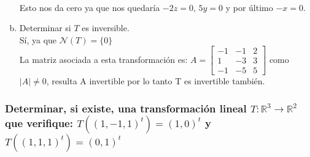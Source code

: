 \documentclass{article}
\begin{document}
\begin{enumerate}[a.]
		\\ Esto nos da cero ya que nos quedaría $-2z = 0$,  $5y=0$ y por último $-x=0$.
	\item
		Determinar si $T$ es inversible. \\
		Sí, ya que $\mathcal{N}(T) = \{ 0\}$
		\\ La matriz asociada a esta transformación es:
		$A=\begin{bmatrix} -1&-1&2\\1&-3&3\\-1&-5&5    \end{bmatrix}$ como $|A| \not = 0$, resulta
		A invertible por lo tanto T es invertible también.
\end{enumerate}

\subsubsection{Determinar, si existe, una transformación lineal $T: \mathbb{R}^3 \rightarrow \mathbb{R}^2$
que verifique: $T((1,-1,1)^t) = (1,0)^t$ y $T((1,1,1)^t) = (0,1)^t$}
\end{document}
